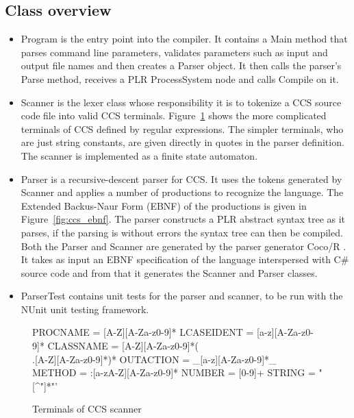 \subsection{Class overview}\label{ccs_class_overview}
	\begin{itemize}
	
	\item \textsf{Program} is the entry point into the compiler. It contains a 
	\textsf{Main} method that parses command line parameters, validates 
	parameters such as input and output file names and then creates a 
	\textsf{Parser} object. It then calls the parser's \textsf{Parse} method, 
	receives a PLR \textsf{ProcessSystem} node and calls \textsf{Compile} on it. 
	
	\item \textsf{Scanner} is the lexer class whose responsibility it is to 
	tokenize a CCS source code file into valid CCS terminals. 
	Figure~\ref{fig:ccs_terminals} shows the more complicated terminals of CCS 
	defined by regular expressions. The simpler terminals, who are just string 
	constants, are given directly in quotes in the parser definition. The 
	scanner is implemented as a finite state automaton.
	
  \item \textsf{Parser} is a recursive-descent parser for CCS. It uses the 
  tokens generated by \textsf{Scanner} and applies a number of 
  \textsf{productions} to recognize the language. The Extended Backus-Naur 
  Form (EBNF) of the productions is given in Figure~\ref{fig:ccs_ebnf}. The 
  parser constructs a PLR abstract syntax tree as it parses, if the parsing is 
  without errors the syntax tree can then be compiled. Both the 
  \textsf{Parser} and \textsf{Scanner} are generated by the parser generator 
  Coco/R \cite{cocor}. It takes as input an EBNF specification of the language 
  interspersed with C\# source code and from that it generates the 
  \textsf{Scanner} and \textsf{Parser} classes. 
	
	\item \textsf{ParserTest} contains unit tests for the parser and scanner, to 
	be run with the NUnit unit testing framework.
	
	\end{itemize}
	
	\begin{figure}
	
\begin{code}
  PROCNAME   = [A-Z][A-Za-z0-9]*
  LCASEIDENT = [a-z][A-Za-z0-9]*
  CLASSNAME  = [A-Z][A-Za-z0-9]*(\\.[A-Z][A-Za-z0-9]*)*
  OUTACTION  = _[a-z][A-Za-z0-9]*_
  METHOD     = :[a-zA-Z][A-Za-z0-9]*
  NUMBER     = [0-9]+
  STRING     = "[^"]*"'
  \end{code}
  \caption{Terminals of CCS scanner}
  \label{fig:ccs_terminals}  
	\end{figure}
	
